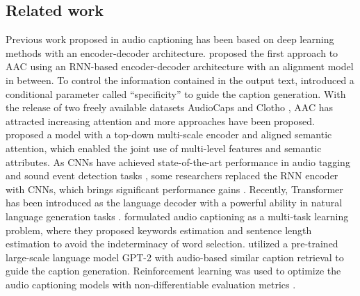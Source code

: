 \documentclass{article}
\begin{document}
\begin{sloppy}
\section{Related work}
\label{sec:related_works}
Previous work proposed in audio captioning has been based on deep learning methods with an encoder-decoder architecture. \citet{drossos2017automated} proposed the first approach to AAC using an RNN-based encoder-decoder architecture with an alignment model in between. To control the information contained in the output text, \citet{ikawa2019neural} introduced a conditional parameter called ``specificity'' to guide the caption generation. With the release of two freely available datasets AudioCaps \cite{kim2019audiocaps} and Clotho \cite{drossos2020clotho}, AAC has attracted increasing attention and more approaches have been proposed. \citet{kim2019audiocaps} proposed a model with a top-down multi-scale encoder and aligned semantic attention, which enabled the joint use of multi-level features and semantic attributes. As CNNs have achieved state-of-the-art performance in audio tagging and sound event detection tasks \cite{kong2020panns}, some researchers replaced the RNN encoder with CNNs, which brings significant performance gains \cite{chen2020audio, xu2021investigating}. Recently, Transformer has been introduced as the language decoder with a powerful ability in natural language  generation tasks \cite{chen2020audio, tran2020wavetransformer, koizumi2020transformer}. \citet{takeuchi2020effects} formulated audio captioning as a multi-task learning problem, where they proposed keywords estimation and sentence length estimation to avoid the indeterminacy of word selection. \citet{koizumi2020audio} utilized a pre-trained large-scale language model GPT-2 \cite{radford2019language} with audio-based similar caption retrieval to guide the caption generation. Reinforcement learning was used to optimize the audio captioning models with non-differentiable evaluation metrics \cite{xu2020crnn}.




\end{sloppy}
\end{document}
